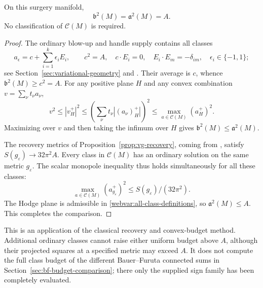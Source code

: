 \begin{proposition}
\label{webvar:all-class-budget}
On this surgery manifold,
\begin{equation}\label{webvar:all-class-value}
 \mathfrak b^2(M)=\mathfrak a^2(M)=A.
\end{equation}
No classification of $\mathcal C(M)$ is required.
\end{proposition}
\begin{proof}
The ordinary blow-up and handle supply contains all classes
\[
 a_\epsilon=c+\sum_{i=1}^k\epsilon_iE_i,\qquad
 c^2=A,\quad c\cdot E_i=0,\quad E_i\cdot E_m=-\delta_{im},
 \quad\epsilon_i\in\{-1,1\};
\]
see Section~\ref{sec:variational-geometry} and
\cite[Proposition~3.2]{LeBrun2001}.  Their average is $c$, whence
$\mathfrak b^2(M)\ge c^2=A$.  For any positive plane $H$ and any
convex combination $v=\sum_\nu t_\nu a_\nu$,
\[
 v^2\le |v_H^+|^2
 \le\left(\sum_\nu t_\nu|(a_\nu)_H^+|\right)^2
 \le\max_{a\in\mathcal C(M)}(a_H^+)^2.
\]
Maximizing over $v$ and then taking the infimum over $H$ gives
$\mathfrak b^2(M)\le\mathfrak a^2(M)$.

The recovery metrics of Proposition~\ref{prop:vg-recovery}, coming
from \cite[Theorem~4.3]{LeBrun2001}, satisfy
$S(g_\varepsilon)\to32\pi^2A$.  Every class in $\mathcal C(M)$
has an ordinary solution on the same metric $g_\varepsilon$.
The scalar monopole inequality thus holds simultaneously for all
these classes:
\[
 \max_{a\in\mathcal C(M)}(a_{g_\varepsilon}^+)^2
       \le S(g_\varepsilon)/(32\pi^2).
\]
The Hodge plane is admissible in \eqref{webvar:all-class-definitions},
so $\mathfrak a^2(M)\le A$.  This completes the comparison.
\end{proof}

This is an application of the classical recovery and convex-budget
method.  Additional ordinary classes cannot raise either uniform
budget above $A$, although their projected squares at a specified
metric may exceed $A$.  It does not compute the full class budget
of the different Bauer--Furuta connected sums in
Section~\ref{sec:bf-budget-comparison}; there only the supplied sign
family has been completely evaluated.

